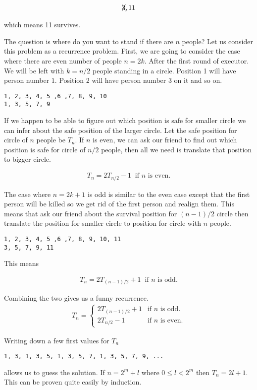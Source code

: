 \documentclass[a4paper, 12pt]{article}
\begin{document}
\begin{align*}
	\xcancel{3}, 11
\end{align*}

which means 11 survives.

The question is where do you want to stand if there are $n$ people? Let us consider this problem as a recurrence problem. First, we are going to consider the case where there are even number of people $n = 2k$. After the first round of executor. We will be left with $k = n/2$ people standing in a circle. Position 1 will have person number $1$. Position 2 will have person number $3$ on it and so on.

\begin{verbatim}
1, 2, 3, 4, 5 ,6 ,7, 8, 9, 10
1, 3, 5, 7, 9 
\end{verbatim}

If we happen to be able to figure out which position is safe for smaller circle we can infer about the safe position of the larger circle. Let the safe position for circle of $n$ people be $T_n$. If $n$ is even, we can ask our friend to find out which position is safe for circle of $n/2$ people, then all we need is translate that position to bigger circle.

\begin{align*}
	T_n = 2T_{n/2} - 1 \;\; \text{if $n$ is even.}
\end{align*}

The case where $n=2k+1$ is odd is similar to the even case except that the first person will be killed so we get rid of the first person and realign them. This means that ask our friend about the survival position for $(n-1)/2$ circle then translate the position for smaller circle to position for circle with $n$ people.

\begin{verbatim}
1, 2, 3, 4, 5 ,6 ,7, 8, 9, 10, 11
3, 5, 7, 9, 11
\end{verbatim}

This means

\begin{align*}
T_n = 2T_{(n-1)/2} + 1 \;\; \text{if $n$ is odd.}
\end{align*}

Combining the two gives us a funny recurrence.
\begin{align*}
	T_n = \begin{cases*}
	2T_{(n-1)/2} + 1 & \text{if $n$ is odd.}\\
	2T_{n/2} - 1 & \text{if $n$ is even.}
	\end{cases*}
\end{align*}

Writing down a few first values for $T_n$
\begin{verbatim}
1, 3, 1, 3, 5, 1, 3, 5, 7, 1, 3, 5, 7, 9, ...
\end{verbatim}
allows us to guess the solution. If $n = 2^m + l$ where $0 \le l < 2^m$ then $T_n = 2l + 1$. This can be proven quite easily by induction.
\end{document}
